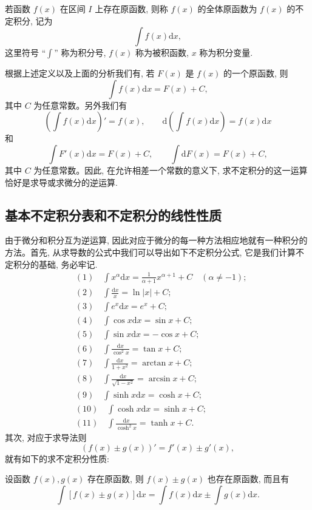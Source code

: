 \begin{definition}\label{definition:ma-6-1-2}
若函数 $f(x)$ 在区间 $I$ 上存在原函数, 则称 $f(x)$ 的全体原函数为 $f(x)$ 的不定积分, 记为
\[
  \int f(x)\mathrm dx,
\]
这里符号 ``$\int$'' 称为积分号, $f(x)$ 称为被积函数, $x$ 称为积分变量.
\end{definition}

根据上述定义以及上面的分析我们有, 若 $F(x)$ 是 $f(x)$ 的一个原函数, 则
\[
  \int f(x)\mathrm dx=F(x)+C,
\]
其中 $C$ 为任意常数。另外我们有
\[
  \left(\int f(x)\mathrm dx\right)'=f(x),
  \qquad
  \mathrm d\left(\int f(x)\mathrm dx\right)=f(x)\mathrm dx
\]
和
\[
  \int F'(x)\mathrm dx=F(x)+C,
  \qquad
  \int \mathrm dF(x)=F(x)+C,
\]
其中 $C$ 为任意常数。因此, 在允许相差一个常数的意义下, 求不定积分的这一运算恰好是求导或求微分的逆运算.

\subsection{基本不定积分表和不定积分的线性性质}
\label{subsec:ma-6-1-2}

由于微分和积分互为逆运算, 因此对应于微分的每一种方法相应地就有一种积分的方法。首先, 从求导数的公式中我们可以导出如下不定积分公式, 它是我们计算不定积分的基础, 务必牢记.
\[
\begin{aligned}
  &(1)\quad \int x^\alpha\mathrm dx=\frac1{\alpha+1}x^{\alpha+1}+C
  \quad(\alpha\ne-1);\\
  &(2)\quad \int\frac{\mathrm dx}{x}=\ln|x|+C;\\
  &(3)\quad \int e^x\mathrm dx=e^x+C;\\
  &(4)\quad \int\cos x\mathrm dx=\sin x+C;\\
  &(5)\quad \int\sin x\mathrm dx=-\cos x+C;\\
  &(6)\quad \int\frac{\mathrm dx}{\cos^2x}=\tan x+C;\\
  &(7)\quad \int\frac{\mathrm dx}{1+x^2}=\arctan x+C;\\
  &(8)\quad \int\frac{\mathrm dx}{\sqrt{1-x^2}}=\arcsin x+C;\\
  &(9)\quad \int\sinh x\mathrm dx=\cosh x+C;\\
  &(10)\quad \int\cosh x\mathrm dx=\sinh x+C;\\
  &(11)\quad \int\frac{\mathrm dx}{\cosh^2x}=\tanh x+C.
\end{aligned}
\]
其次, 对应于求导法则
\[
  (f(x)\pm g(x))'=f'(x)\pm g'(x),
\]
就有如下的求不定积分性质:

\begin{property}\label{property:ma-6-1-1}
设函数 $f(x),g(x)$ 存在原函数, 则 $f(x)\pm g(x)$ 也存在原函数, 而且有
\[
  \int[f(x)\pm g(x)]\mathrm dx
  =
  \int f(x)\mathrm dx\pm\int g(x)\mathrm dx.
\]
\end{property}


